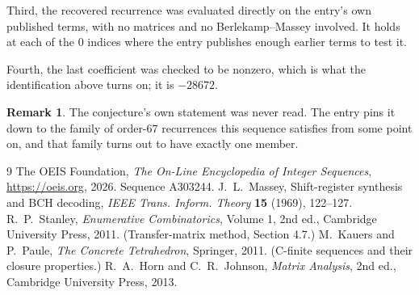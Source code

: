 \documentclass[11pt,a4paper]{article}
\theoremstyle{plain}
\theoremstyle{definition}
\newtheorem{remark}[theorem]{Remark}
\begin{document}
Third, the recovered recurrence was evaluated directly on the entry's own published terms, with
no matrices and no Berlekamp--Massey involved. It holds at each of the $0$ indices where
the entry publishes enough earlier terms to test it.

Fourth, the last coefficient was checked to be nonzero, which is what the identification above
turns on; it is $-28672$.

\begin{remark}
The conjecture's own statement was never read. The entry pins it down to the family of
order-$67$ recurrences this sequence satisfies from some point on, and that family turns
out to have exactly one member.
\end{remark}

\begin{thebibliography}{9}
 The OEIS Foundation, \emph{The On-Line Encyclopedia of Integer
Sequences}, \url{https://oeis.org}, 2026. Sequence A303244.
 J.~L.~Massey, Shift-register synthesis and BCH decoding, \emph{IEEE
Trans. Inform. Theory} \textbf{15} (1969), 122--127.
 R.~P.~Stanley, \emph{Enumerative Combinatorics}, Volume 1, 2nd ed.,
Cambridge University Press, 2011. (Transfer-matrix method, Section 4.7.)
 M.~Kauers and P.~Paule, \emph{The Concrete Tetrahedron}, Springer, 2011.
(C-finite sequences and their closure properties.)
 R.~A.~Horn and C.~R.~Johnson, \emph{Matrix Analysis}, 2nd ed., Cambridge
University Press, 2013.
\end{thebibliography}
\end{document}
